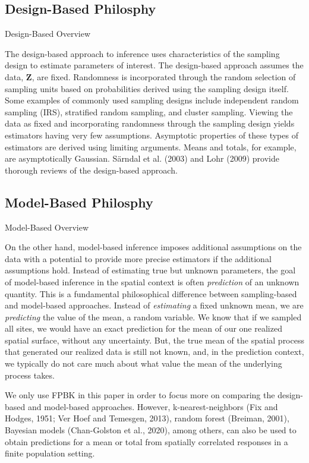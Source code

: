 \documentclass[]{elsarticle} %
\begin{document}
\hypertarget{design-based-philosphy}{%
\subsection{Design-Based Philosphy}\label{design-based-philosphy}}

Design-Based Overview

The design-based approach to inference uses characteristics of the
sampling design to estimate parameters of interest. The design-based
approach assumes the data, \(\mathbf{Z}\), are fixed. Randomness is
incorporated through the random selection of sampling units based on
probabilities derived using the sampling design itself. Some examples of
commonly used sampling designs include independent random sampling
(IRS), stratified random sampling, and cluster sampling. Viewing the
data as fixed and incorporating randomness through the sampling design
yields estimators having very few assumptions. Asymptotic properties of
these types of estimators are derived using limiting arguments. Means
and totals, for example, are asymptotically Gaussian. Särndal et al.
(2003) and Lohr (2009) provide thorough reviews of the design-based
approach.

\hypertarget{model-based-philosphy}{%
\subsection{Model-Based Philosphy}\label{model-based-philosphy}}

Model-Based Overview

On the other hand, model-based inference imposes additional assumptions
on the data with a potential to provide more precise estimators if the
additional assumptions hold. Instead of estimating true but unknown
parameters, the goal of model-based inference in the spatial context is
often \emph{prediction} of an unknown quantity. This is a fundamental
philosophical difference between sampling-based and model-based
approaches. Instead of \emph{estimating} a fixed unknown mean, we are
\emph{predicting} the value of the mean, a random variable. We know that
if we sampled all sites, we would have an exact prediction for the mean
of our one realized spatial surface, without any uncertainty. But, the
true mean of the spatial process that generated our realized data is
still not known, and, in the prediction context, we typically do not
care much about what value the mean of the underlying process takes.

We only use FPBK in this paper in order to focus more on comparing the
design-based and model-based approaches. However, k-nearest-neighbors
(Fix and Hodges, 1951; Ver Hoef and Temesgen, 2013), random forest
(Breiman, 2001), Bayesian models (Chan-Golston et al., 2020), among
others, can also be used to obtain predictions for a mean or total from
spatially correlated responses in a finite population setting.
\end{document}
